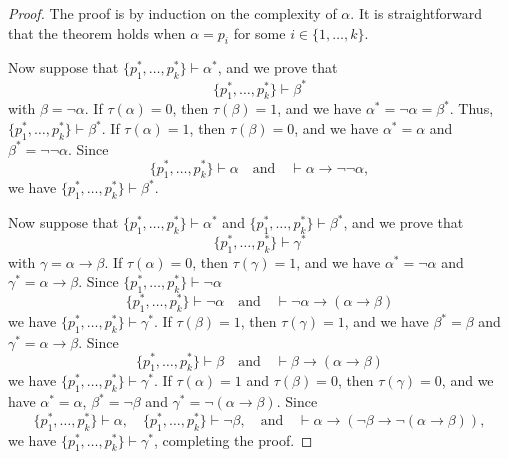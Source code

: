 \begin{proof}
  The proof is by induction on the complexity of $\alpha$.
  It is straightforward that the theorem holds when $\alpha = p_i$ for some
  $i \in \{1, \dots, k\}$.

  Now suppose that $\{p_1^*, \dots, p_k^*\} \vdash \alpha^*$, and we prove
  that
  \begin{equation*}
    \{p_1^*, \dots, p_k^*\} \vdash \beta^*
  \end{equation*}
  with $\beta = \neg\alpha$.
  If $\tau(\alpha) = 0$, then $\tau(\beta) = 1$, and we have
  $\alpha^* = \neg\alpha = \beta^*$.
  Thus, $\{p_1^*, \dots, p_k^*\} \vdash \beta^*$.
  If $\tau(\alpha) = 1$, then $\tau(\beta) = 0$, and we have
  $\alpha^* = \alpha$ and $\beta^* = \neg\neg\alpha$.
  Since
  \begin{equation*}
    \{p_1^*, \dots, p_k^*\} \vdash \alpha
    \quad \text{and} \quad
    \vdash \alpha \to \neg\neg\alpha,
  \end{equation*}
  we have $\{p_1^*, \dots, p_k^*\} \vdash \beta^*$.

  Now suppose that $\{p_1^*, \dots, p_k^*\} \vdash \alpha^*$ and
  $\{p_1^*, \dots, p_k^*\} \vdash \beta^*$, and we prove that
  \begin{equation*}
    \{p_1^*, \dots, p_k^*\} \vdash \gamma^*
  \end{equation*}
  with $\gamma = \alpha \to \beta$.
  If $\tau(\alpha) = 0$, then $\tau(\gamma) = 1$, and we have
  $\alpha^* = \neg\alpha$ and $\gamma^* = \alpha \to \beta$.
  Since $\{p_1^*, \dots, p_k^*\} \vdash \neg\alpha$
  \begin{equation*}
    \{p_1^*, \dots, p_k^*\} \vdash \neg\alpha
    \quad \text{and} \quad
    \vdash \neg\alpha \to (\alpha \to \beta)
  \end{equation*}
  we have $\{p_1^*, \dots, p_k^*\} \vdash \gamma^*$.
  If $\tau(\beta) = 1$, then $\tau(\gamma) = 1$, and we have
  $\beta^* = \beta$ and $\gamma^* = \alpha \to \beta$.
  Since
  \begin{equation*}
    \{p_1^*, \dots, p_k^*\} \vdash \beta
    \quad \text{and} \quad
    \vdash \beta \to (\alpha \to \beta)
  \end{equation*}
  we have $\{p_1^*, \dots, p_k^*\} \vdash \gamma^*$.
  If $\tau(\alpha) = 1$ and $\tau(\beta) = 0$, then
  $\tau(\gamma) = 0$, and we have $\alpha^* = \alpha$, 
  $\beta^* = \neg\beta$ and $\gamma^* = \neg(\alpha \to \beta)$.
  Since
  \begin{equation*}
    \{p_1^*, \dots, p_k^*\} \vdash \alpha,
    \quad
    \{p_1^*, \dots, p_k^*\} \vdash \neg\beta,
    \quad \text{and} \quad
    \vdash \alpha \to (\neg\beta \to \neg(\alpha \to \beta)),
  \end{equation*}
  we have $\{p_1^*, \dots, p_k^*\} \vdash \gamma^*$, completing the proof.
\end{proof}